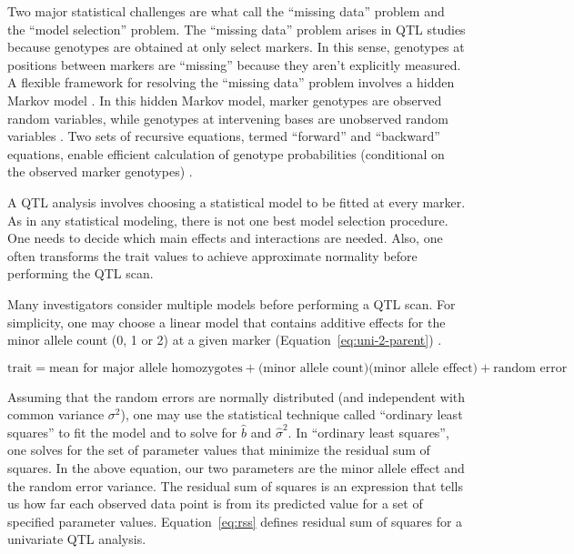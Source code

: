 \documentclass[]{article}\usepackage[]{graphicx}\usepackage[]{color}
\begin{document}
Two major statistical challenges are what \citet{broman2009guide} call 
the ``missing data'' problem and the ``model selection'' problem. 
The ``missing data'' problem arises in QTL studies because genotypes are obtained
at only select markers. In this sense, genotypes at positions between
markers are ``missing'' because they aren't explicitly measured.
A flexible framework for resolving the ``missing data'' problem involves a
hidden Markov model \citep{broman2009guide, broman2006use}. 
In this hidden Markov model, marker genotypes are observed random variables, 
while genotypes at intervening bases are unobserved random variables \citep{broman2009guide,broman2006use}. 
Two sets of recursive equations, termed ``forward'' and ``backward'' equations,
enable efficient calculation of genotype probabilities
(conditional on the observed marker genotypes) \citep{baum1970maximization}.


A QTL analysis involves choosing a statistical model to be fitted at every marker. 
As in any statistical modeling, there is not one best model selection procedure.
One needs to decide which main effects and interactions are needed.
Also, one often transforms the trait values to achieve approximate normality before performing the QTL scan. 

Many investigators consider multiple models before performing a QTL scan.
For simplicity, one may choose a linear model that contains additive effects for
the  minor allele count (0, 1 or 2) at a given marker (Equation~\ref{eq:uni-2-parent}) \citep{martinez1992estimating,haley1992simple}.

\begin{equation}
\text{trait} = \text{mean for major allele homozygotes} + \text{(minor allele count)}\text{(minor allele effect)} + \text{random error}
\label{eq:uni-2-parent}
\end{equation}

Assuming that the random errors are normally distributed (and independent with common
variance $\sigma^2$), one may use the statistical technique called ``ordinary least squares''
to fit the model and to solve for $\hat b$ and $\hat \sigma^2$.
In ``ordinary least squares'', one solves for the set of parameter values that
minimize the residual sum of squares. In the above equation, our two parameters are the minor allele effect and the random error variance. The residual sum of squares is an expression that tells us how far each observed data point is from its predicted value for a set of specified parameter values. Equation~\ref{eq:rss} defines residual sum of squares for a univariate QTL analysis.
\end{document}
